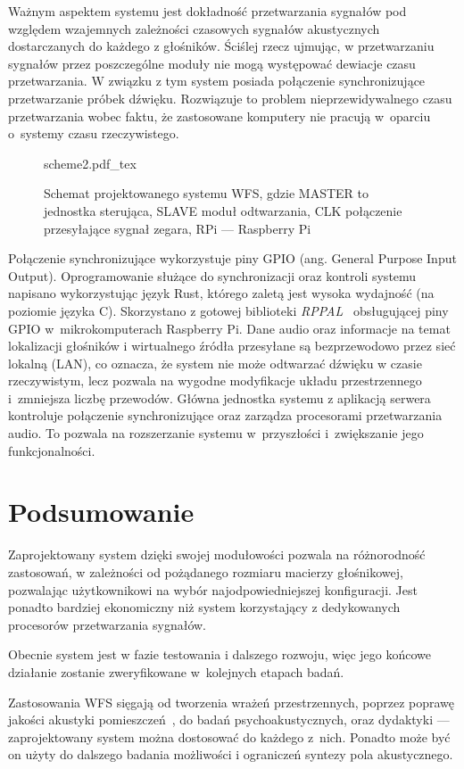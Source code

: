 \documentclass[12pt]{oska}
\let\Oldsection\section
\renewcommand{\section}{\FloatBarrier\Oldsection}
\begin{document}
Ważnym aspektem systemu jest dokładność przetwarzania sygnałów pod względem
wzajemnych zależności czasowych sygnałów akustycznych dostarczanych do każdego
z głośników.  Ściślej rzecz ujmując, w przetwarzaniu sygnałów przez
poszczególne moduły nie mogą występować dewiacje czasu przetwarzania. W związku
z tym system posiada połączenie synchronizujące przetwarzanie próbek dźwięku.
Rozwiązuje to problem nieprzewidywalnego czasu przetwarzania wobec faktu, że
zastosowane komputery nie pracują w~oparciu o~systemy czasu rzeczywistego.

\begin{figure}[H]
  \centering
  {scheme2.pdf_tex}
  \caption{Schemat projektowanego systemu WFS, gdzie MASTER to jednostka sterująca, SLAVE moduł odtwarzania, CLK połączenie przesyłające sygnał zegara, RPi --- Raspberry Pi}
  \label{fig:schemat}
\end{figure}

Połączenie synchronizujące wykorzystuje piny GPIO (ang. General Purpose Input Output). Oprogramowanie służące do
synchronizacji oraz kontroli systemu napisano wykorzystując język Rust, którego
zaletą jest wysoka wydajność (na poziomie języka C). Skorzystano z gotowej
biblioteki \emph{RPPAL}~\cite{RPPAL} obsługującej piny GPIO w~mikrokomputerach
Raspberry Pi. Dane audio oraz informacje na temat lokalizacji głośników i
wirtualnego źródła przesyłane są bezprzewodowo przez sieć lokalną (LAN), co
oznacza, że system nie może odtwarzać dźwięku w czasie rzeczywistym, lecz
pozwala na wygodne modyfikacje układu przestrzennego i~zmniejsza liczbę
przewodów. Główna jednostka systemu z aplikacją serwera kontroluje połączenie
synchronizujące oraz zarządza procesorami przetwarzania audio. To pozwala na rozszerzanie
systemu w~przyszłości i~zwiększanie jego funkcjonalności.

\section{Podsumowanie}

Zaprojektowany system dzięki swojej modułowości pozwala na różnorodność
zastosowań, w zależności od pożądanego rozmiaru macierzy głośnikowej,
pozwalając użytkownikowi na wybór najodpowiedniejszej konfiguracji. Jest
ponadto bardziej ekonomiczny niż system korzystający z dedykowanych procesorów
przetwarzania sygnałów.

Obecnie system jest w fazie testowania i dalszego rozwoju, więc jego końcowe
działanie zostanie zweryfikowane w~kolejnych etapach badań.

Zastosowania WFS sięgają od tworzenia wrażeń przestrzennych, poprzez poprawę
jakości akustyki pomieszczeń~\cite{enhancement}, do badań psychoakustycznych,
oraz dydaktyki --- zaprojektowany system można dostosować do każdego z~nich.
Ponadto może być on użyty do dalszego badania możliwości i ograniczeń syntezy
pola akustycznego.

\printbibliography
\end{document}
